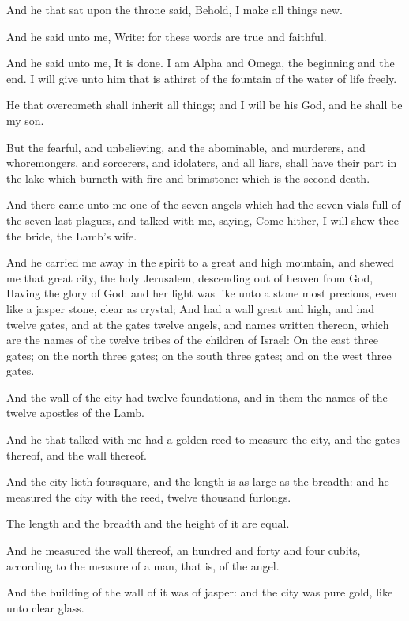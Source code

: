 \verse And he that sat upon the throne said, Behold, I make all things new.

And he said unto me, Write: for these words are true and faithful.

\verse And he said unto me, It is done. I am Alpha and Omega, the beginning and the end. I will give unto him that is athirst of the fountain of the water of life freely.

\verse He that overcometh shall inherit all things; and I will be his God, and he shall be my son.

\verse But the fearful, and unbelieving, and the abominable, and murderers, and whoremongers, and sorcerers, and idolaters, and all liars, shall have their part in the lake which burneth with fire and brimstone: which is the second death.

\verse And there came unto me one of the seven angels which had the seven vials full of the seven last plagues, and talked with me, saying, Come hither, I will shew thee the bride, the Lamb's wife.

\verse And he carried me away in the spirit to a great and high mountain, and shewed me that great city, the holy Jerusalem, descending out of heaven from God, \verse Having the glory of God: and her light was like unto a stone most precious, even like a jasper stone, clear as crystal; \verse And had a wall great and high, and had twelve gates, and at the gates twelve angels, and names written thereon, which are the names of the twelve tribes of the children of Israel: \verse On the east three gates; on the north three gates; on the south three gates; and on the west three gates.

\verse And the wall of the city had twelve foundations, and in them the names of the twelve apostles of the Lamb.

\verse And he that talked with me had a golden reed to measure the city, and the gates thereof, and the wall thereof.

\verse And the city lieth foursquare, and the length is as large as the breadth: and he measured the city with the reed, twelve thousand furlongs.

The length and the breadth and the height of it are equal.

\verse And he measured the wall thereof, an hundred and forty and four cubits, according to the measure of a man, that is, of the angel.

\verse And the building of the wall of it was of jasper: and the city was pure gold, like unto clear glass.

